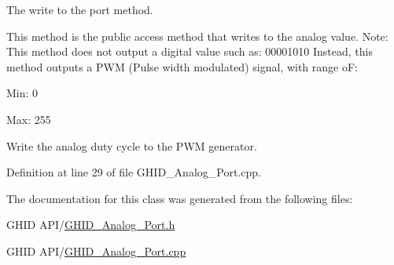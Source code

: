 \-The write to the port method. 

\-This method is the public access method that writes to the analog value. \-Note\-: \-This method does not output a digital value such as\-: 00001010 \-Instead, this method outputs a \-P\-W\-M (\-Pulse width modulated) signal, with range o\-F\-:
\begin{DoxyItemize}
\item \-Min\-: 0
\item \-Max\-: 255 
\end{DoxyItemize}\-Write the analog duty cycle to the \-P\-W\-M generator. 

\-Definition at line 29 of file \-G\-H\-I\-D\-\_\-\-Analog\-\_\-\-Port.\-cpp.



\-The documentation for this class was generated from the following files\-:\begin{DoxyCompactItemize}
\item 
\-G\-H\-I\-D A\-P\-I/\hyperlink{_g_h_i_d___analog___port_8h}{\-G\-H\-I\-D\-\_\-\-Analog\-\_\-\-Port.\-h}\item 
\-G\-H\-I\-D A\-P\-I/\hyperlink{_g_h_i_d___analog___port_8cpp}{\-G\-H\-I\-D\-\_\-\-Analog\-\_\-\-Port.\-cpp}\end{DoxyCompactItemize}
